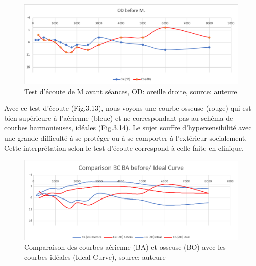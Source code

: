 \begin{figure}[tbh]
	\centering
	\includegraphics[width=0.7\linewidth]{images/clinique/od_before_m.png}
	\caption{Test d'écoute de M avant séances, OD: oreille droite, source: auteure}
	\label{fig:odbeforemeyer}
\end{figure}

Avec ce test d'écoute (Fig.3.13), nous voyons une 
courbe osseuse (rouge) qui est bien supérieure à l'aérienne (bleue) et ne correspondant pas au schéma 
de courbes harmonieuses, idéales (Fig.3.14). Le sujet souffre d'hypersensibilité 
avec une 
grande 
difficulté à se protéger ou à se comporter à l'extérieur socialement. Cette interprétation selon le test 
d'écoute   
correspond à 
celle faite en clinique.
	\begin{figure}
	\centering
	\includegraphics[width=0.7\linewidth]{images/clinique/comparison_bc_ba_before_vs_ideal_curve_meyer.png}
	\caption[Comparaison avec la courbe idéale]{Comparaison des
		courbes aérienne (BA) et osseuse (BO) avec les courbes idéales (Ideal Curve), source: auteure}
	\label{fig:comparisonbcbabeforevsidealcurvemeyer}
\end{figure}


